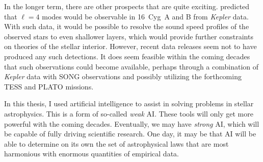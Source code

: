 In the longer term, there are other prospects that are quite exciting. 
\citet{2014ApJ...782....2L} predicted that $\ell=4$ modes would be observable in 16~Cyg~A and B from \emph{Kepler} data. 
With such data, it would be possible to resolve the sound speed profiles of the observed stars to even shallower layers, which would provide further constraints on theories of the stellar interior. 
However, recent data releases seem not to have produced any such detections. 
It does seem feasible within the coming decades that such observations could become available, perhaps through a combination of \emph{Kepler} data with SONG observations \citep{2014RMxAC..45...83A, 2017ApJ...836..142G} and possibly utilizing the forthcoming TESS and PLATO missions. 

In this thesis, I used artificial intelligence to assist in solving problems in stellar astrophysics. 
This is a form of so-called \emph{weak} AI. 
These tools will only get more powerful with the coming decades. 
Eventually, we may have \emph{strong} AI, which will be capable of fully driving scientific research. 
One day, it may be that AI will be able to determine on its own the set of astrophysical laws that are most harmonious with enormous quantities of empirical data. 


